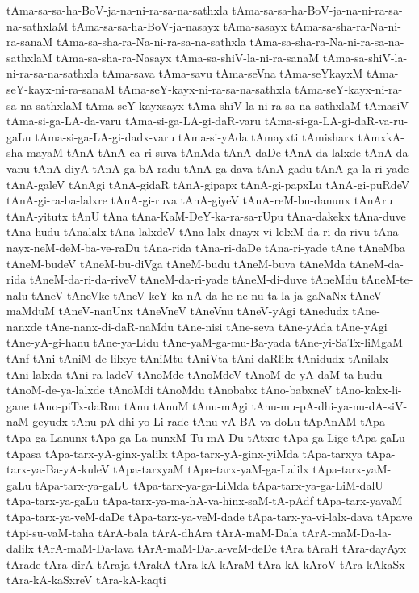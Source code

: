 {tAma-sa-sa-ha-BoV-ja-na-ni-ra-sa-na-sathxla
tAma-sa-sa-ha-BoV-ja-na-ni-ra-sa-na-sathxlaM
tAma-sa-sa-ha-BoV-ja-nasayx
tAma-sasayx
tAma-sa-sha-ra-Na-ni-ra-sanaM
tAma-sa-sha-ra-Na-ni-ra-sa-na-sathxla
tAma-sa-sha-ra-Na-ni-ra-sa-na-sathxlaM
tAma-sa-sha-ra-Nasayx
tAma-sa-shiV-la-ni-ra-sanaM
tAma-sa-shiV-la-ni-ra-sa-na-sathxla
tAma-sava
tAma-savu
tAma-seVna
tAma-seYkayxM
tAma-seY-kayx-ni-ra-sanaM
tAma-seY-kayx-ni-ra-sa-na-sathxla
tAma-seY-kayx-ni-ra-sa-na-sathxlaM
tAma-seY-kayxsayx
tAma-shiV-la-ni-ra-sa-na-sathxlaM
tAmasiV
tAma-si-ga-LA-da-varu
tAma-si-ga-LA-gi-daR-varu
tAma-si-ga-LA-gi-daR-va-ru-gaLu
tAma-si-ga-LA-gi-dadx-varu
tAma-si-yAda
tAmayxti
tAmisharx
tAmxkA-sha-mayaM
tAnA
tAnA-ca-ri-suva
tAnAda
tAnA-daDe
tAnA-da-lalxde
tAnA-da-vanu
tAnA-diyA
tAnA-ga-bA-radu
tAnA-ga-dava
tAnA-gadu
tAnA-ga-la-ri-yade
tAnA-galeV
tAnAgi
tAnA-gidaR
tAnA-gipapx
tAnA-gi-papxLu
tAnA-gi-puRdeV
tAnA-gi-ra-ba-lalxre
tAnA-gi-ruva
tAnA-giyeV
tAnA-reM-bu-danunx
tAnAru
tAnA-yitutx
tAnU
tAna
tAna-KaM-DeY-ka-ra-sa-rUpu
tAna-dakekx
tAna-duve
tAna-hudu
tAnalalx
tAna-lalxdeV
tAna-lalx-dnayx-vi-lelxM-da-ri-da-rivu
tAna-nayx-neM-deM-ba-ve-raDu
tAna-rida
tAna-ri-daDe
tAna-ri-yade
tAne
tAneMba
tAneM-budeV
tAneM-bu-diVga
tAneM-budu
tAneM-buva
tAneMda
tAneM-da-rida
tAneM-da-ri-da-riveV
tAneM-da-ri-yade
tAneM-di-duve
tAneMdu
tAneM-te-nalu
tAneV
tAneVke
tAneV-keY-ka-nA-da-he-ne-nu-ta-la-ja-gaNaNx
tAneV-maMduM
tAneV-nanUnx
tAneVneV
tAneVnu
tAneV-yAgi
tAnedudx
tAne-nanxde
tAne-nanx-di-daR-naMdu
tAne-nisi
tAne-seva
tAne-yAda
tAne-yAgi
tAne-yA-gi-hanu
tAne-ya-Lidu
tAne-yaM-ga-mu-Ba-yada
tAne-yi-SaTx-liMgaM
tAnf
tAni
tAniM-de-lilxye
tAniMtu
tAniVta
tAni-daRlilx
tAnidudx
tAnilalx
tAni-lalxda
tAni-ra-ladeV
tAnoMde
tAnoMdeV
tAnoM-de-yA-daM-ta-hudu
tAnoM-de-ya-lalxde
tAnoMdi
tAnoMdu
tAnobabx
tAno-babxneV
tAno-kakx-li-gane
tAno-piTx-daRnu
tAnu
tAnuM
tAnu-mAgi
tAnu-mu-pA-dhi-ya-nu-dA-siV-naM-geyudx
tAnu-pA-dhi-yo-Li-rade
tAnu-vA-BA-va-doLu
tApAnAM
tApa
tApa-ga-Lanunx
tApa-ga-La-nunxM-Tu-mA-Du-tAtxre
tApa-ga-Lige
tApa-gaLu
tApasa
tApa-tarx-yA-ginx-yalilx
tApa-tarx-yA-ginx-yiMda
tApa-tarxya
tApa-tarx-ya-Ba-yA-kuleV
tApa-tarxyaM
tApa-tarx-yaM-ga-Lalilx
tApa-tarx-yaM-gaLu
tApa-tarx-ya-gaLU
tApa-tarx-ya-ga-LiMda
tApa-tarx-ya-ga-LiM-dalU
tApa-tarx-ya-gaLu
tApa-tarx-ya-ma-hA-va-hinx-saM-tA-pAdf
tApa-tarx-yavaM
tApa-tarx-ya-veM-daDe
tApa-tarx-ya-veM-dade
tApa-tarx-ya-vi-lalx-dava
tApave
tApi-su-vaM-taha
tArA-bala
tArA-dhAra
tArA-maM-Dala
tArA-maM-Da-la-dalilx
tArA-maM-Da-lava
tArA-maM-Da-la-veM-deDe
tAra
tAraH
tAra-dayAyx
tArade
tAra-dirA
tAraja
tArakA
tAra-kA-kAraM
tAra-kA-kAroV
tAra-kAkaSx
tAra-kA-kaSxreV
tAra-kA-kaqti
}
